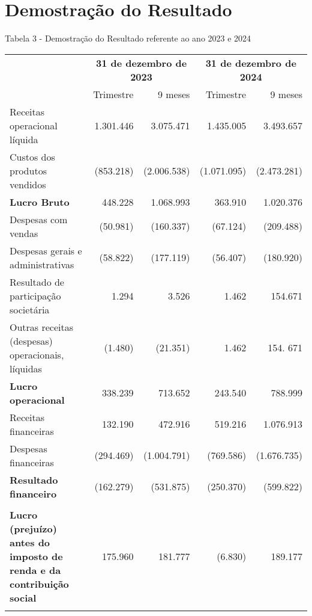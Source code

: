 \documentclass[1pt,a4paper]{article}
\begin{document}
		\centering\section*{Demostração do Resultado}
		Tabela 3 - Demostração do Resultado referente ao ano 2023 e 2024
		\begin{longtable}{p{6cm}r r r r }
			\toprule
			& \multicolumn{2}{c}{\textbf{31 de dezembro de 2023}} & \multicolumn{2}{c}{\textbf{31 de dezembro de 2024}} \\
			\cmidrule(lr){2-3} \cmidrule(lr){4-5}
			& Trimestre & 9 meses & Trimestre & 9 meses \\
			\midrule
			\endhead
			Receitas operacional líquida & 1.301.446 & 3.075.471 & 1.435.005 & 3.493.657 \\
			Custos dos produtos vendidos & (853.218) &(2.006.538) & (1.071.095)& (2.473.281) \\
			\cmidrule(lr){2-3} \cmidrule(lr){4-5}
			\rowcolor{darkgray} \textbf{Lucro Bruto} & 448.228 & 1.068.993 & 363.910 & 1.020.376 \\
			\cmidrule(lr){2-3} \cmidrule(lr){4-5}
			Despesas com vendas & (50.981) & (160.337) & (67.124) &(209.488) \\
			Despesas gerais e administrativas & (58.822) & (177.119) & (56.407) & (180.920) \\
			Resultado de participação societária & 1.294 & 3.526 & 1.462 & 154.671 \\
			Outras receitas (despesas) operacionais, líquidas & (1.480) & (21.351) & 1.462 & 154. 671 \\
			\cmidrule(lr){2-3} \cmidrule(lr){4-5}
			\rowcolor{darkgray}\textbf{Lucro operacional} & 338.239 & 713.652 & 243.540 & 788.999 \\ 
			\cmidrule(lr){2-3} \cmidrule(lr){4-5}
			Receitas financeiras & 132.190 & 472.916 & 519.216 & 1.076.913 \\
			Despesas financeiras & (294.469) & (1.004.791) & (769.586) & (1.676.735)\\
			\cmidrule(lr){2-3} \cmidrule(lr){4-5}
			\rowcolor{darkgray}\textbf{Resultado financeiro} & (162.279) & (531.875) & (250.370) & (599.822) \\
			\cmidrule(lr){2-3} \cmidrule(lr){4-5}\\
			\rowcolor{darkgray}\textbf{Lucro (prejuízo) antes do imposto de renda e da contribuição social}  & 175.960 & 181.777 & (6.830) & 189.177 \\
			\cmidrule(lr){2-3} \cmidrule(lr){4-5}\\

\end{longtable}
\end{document}

